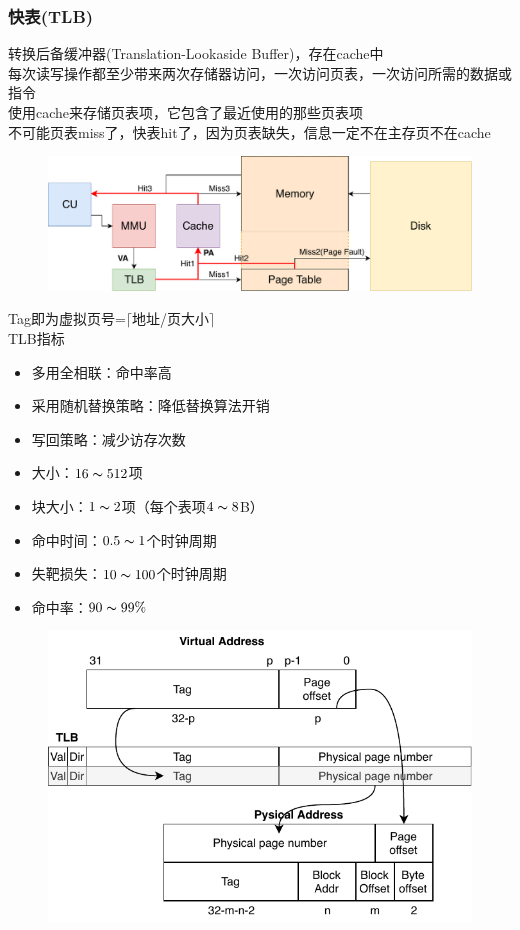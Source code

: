 \subsubsection{快表(TLB)}
转换后备缓冲器(Translation-Lookaside Buffer)，存在cache中\\
每次读写操作都至少带来两次存储器访问，一次访问页表，一次访问所需的数据或指令\\
使用cache来存储页表项，它包含了最近使用的那些页表项\\
不可能页表miss了，快表hit了，因为页表缺失，信息一定不在主存页不在cache
\begin{figure}[H]
\centering
\includegraphics[width=0.6\linewidth]{fig/Cache-page.pdf}
\end{figure}
Tag即为虚拟页号=$\lceil$地址/页大小$\rceil$\\
TLB指标
\begin{itemize}
	\item 多用全相联：命中率高
	\item 采用随机替换策略：降低替换算法开销
	\item 写回策略：减少访存次数
	\item 大小：$16\thicksim 512$项
	\item 块大小：$1\thicksim 2$项（每个表项$4\thicksim 8$B）
	\item 命中时间：$0.5\thicksim 1$个时钟周期
	\item 失靶损失：$10\thicksim 100$个时钟周期
	\item 命中率：$90\thicksim 99\%$
\end{itemize}
\begin{figure}[H]
\centering
\includegraphics[width=0.5\linewidth]{fig/Cache-page_address.pdf}
\end{figure}

